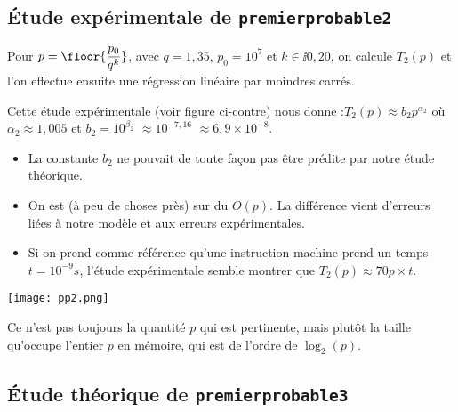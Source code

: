 \subsection{Étude expérimentale de \texttt{premierprobable2}}
Pour $p = \floor{\dfrac{p_0}{q^k}}$, avec $q = 1,35$, $p_0 = 10^7$ et $k\in\ii{0,20}$, on calcule $T_2(p)$ et l'on effectue ensuite une régression linéaire par moindres carrés.

\begin{minipage}[c]{.48\linewidth}
Cette étude expérimentale (voir figure ci-contre)%
  nous donne :$ T_{2}(p)\approx b_{2} p^{\alpha_{2}}$ où $\alpha_{2}\approx 1,005$ 
   et $b_{2} = 10^{\beta_{2}}$ $\approx 10^{-7,16}$ $\approx 6,9\times 10^{-8}$.

\begin{itemize}
\item[\textbullet] La constante $b_{2}$ ne pouvait de toute façon pas être prédite
  par notre étude théorique.
\item[\textbullet] On est (à peu de choses près) sur du $O(p)$. La différence vient
  d'erreurs liées à notre modèle et aux erreurs expérimentales.
\item[\textbullet] Si on prend comme référence qu'une instruction machine prend
  un temps $t = 10^{-9}s$, l'étude expérimentale semble montrer que
  $T_{2}(p)\approx 70 p \times t$.
\end{itemize}
\end{minipage}\hfill
\begin{minipage}[c]{.48\linewidth}
  \begin{center}
    \texttt{[image: pp2.png]}
 \end{center}
\end{minipage}

\begin{rem}
  Ce n'est pas toujours la quantité $p$ qui est pertinente, mais plutôt la taille qu'occupe l'entier $p$ en mémoire, qui est de l'ordre de $\log_2(p)$.
\end{rem}


\subsection{Étude théorique de \texttt{premierprobable3}}

